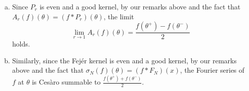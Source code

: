 \begin{exrc}[17]
\begin{soln}
    \begin{enumerate}[(a)]
    \item
        Since \(P_r\) is even and a good kernel,
        by our remarks above and the fact that \(A_r(f)(\theta) = (f * P_r)(\theta)\),
        the limit
        \begin{equation*}
            \lim_{r \to 1} A_r(f)(\theta) = \frac{f(\theta^+) - f(\theta^-)}{2}
        \end{equation*}
        holds.
    
    \item
        Similarly, since the Fejér kernel is even and a good kernel,
        by our remarks above and the fact that \(\sigma_N(f)(\theta) = (f * F_N)(x)\),
        the Fourier series of \(f\) at \(\theta\) is Cesàro summable to \(\frac{f(\theta^+)
        + f(\theta^-)}{2}\).

    \end{enumerate}

\end{soln}
\end{exrc}
